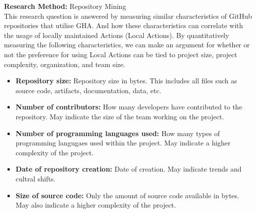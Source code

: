 \documentclass[conference]{IEEEtran}
\begin{document}
        \textbf{Research Method:}  Repository Mining \\
          This research question is answered by measuring similar characteristics of GitHub repositories that utilise GHA. And how these characteristics can correlate with the usage of locally maintained Actions (Local Actions). By quantitatively measuring the following characteristics, we can make an argument for whether or not the preference for using Local Actions can be tied to project size, project complexity, organization, and team size. \\
          \begin{itemize}
            \item \textbf{Repository size:} Repository size in bytes. This includes all files such as source code, artifacts, documentation, data, etc.
            \item \textbf{Number of contributors:} How many developers have contributed to the repository. May indicate the size of the team working on the project.
            \item	\textbf{Number of programming languages used:} How many types of programming langugaes used within the project. May indicate a higher complexity of the project.
            \item \textbf{Date of repository creation:} Date of creation. May indicate trends and cultral shifts.\\
            \item \textbf{Size of source code:} Only the amount of source code available in bytes. May also indicate a higher complexity of the project. \\
          \end{itemize}
          
\end{document}
